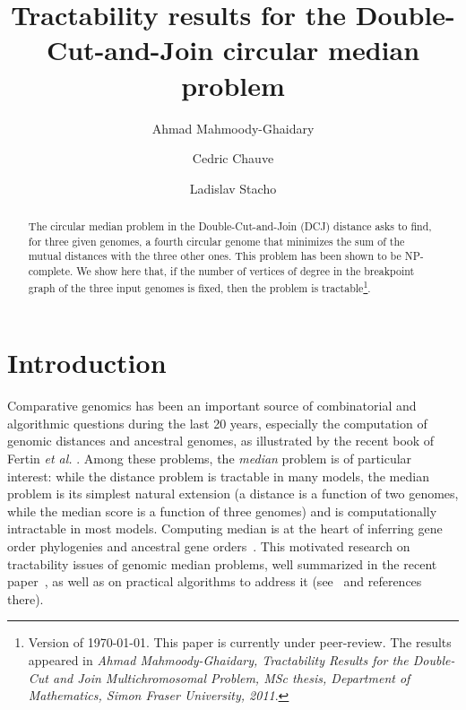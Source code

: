 \documentclass[10pt]{llncs}
\title{Tractability results for the Double-Cut-and-Join circular
  median problem}
\author{
  Ahmad Mahmoody-Ghaidary \inst{1,2}
  \and
  Cedric Chauve \inst{1}
  \and
  Ladislav Stacho \inst{1}
}
\institute{Department of Mathematics, Simon Fraser University, Burnaby
  (BC), Canada
\and Department of Computer Science, Brown University, Providence (RI), USA}
\begin{document}
\maketitle



\begin{abstract}
  The circular median problem in the Dou\-ble-Cut-and-Join (DCJ)
  distance asks to find, for three given genomes, a fourth circular
  genome that minimizes the sum of the mutual distances with the three
  other ones. This problem has been shown to be NP-complete. We show
  here that, if the number of vertices of degree  in the breakpoint
  graph of the three input genomes is fixed, then the problem is
  tractable\footnote{Version of \today. This paper is currently under
    peer-review. The results appeared in {\em Ahmad Mahmoody-Ghaidary,
      Tractability Results for the Double-Cut and Join
      Multichromosomal Problem, MSc thesis, Department of Mathematics,
      Simon Fraser University, 2011}.}.
\end{abstract}



\section{Introduction} \label{sec:intro}

Comparative genomics has been an important source of combinatorial and
algorithmic questions during the last 20 years, especially the
computation of genomic distances and ancestral genomes, as illustrated
by the recent book of Fertin {\em et al.}  \cite{Fertin2009}. Among
these problems, the {\em median} problem is of particular interest:
while the distance problem is tractable in many models, the median
problem is its simplest natural extension (a distance is a function of
two genomes, while the median score is a function of three genomes)
and is computationally intractable in most models. Computing median is
at the heart of inferring gene order phylogenies and ancestral gene
orders~\cite{Murphy2005,Lin2010,Xu2011}. This motivated research on
tractability issues of genomic median problems, well summarized in the
recent paper~\cite{Tannier2009}, as well as on practical algorithms to
address it (see~\cite{Xu2008,Zhang2009,Xu2009a,Xu2009b} and references
there).
\end{document}
